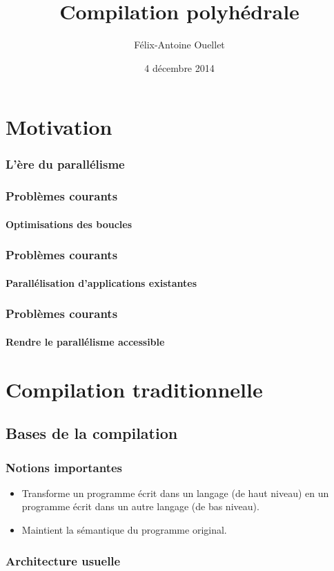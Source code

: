\documentclass{beamer}
\author[Félix-Antoine Ouellet]{Félix-Antoine Ouellet}
\title[PolyOpt\hspace{2em}\insertframenumber/\inserttotalframenumber]{Compilation polyhédrale}
\institute{Université de Sherbrooke}
\date{4 décembre 2014}
\begin{document}
\begin{frame}
\titlepage %
\end{frame}

\begin{frame}
\tableofcontents[hideallsubsections]
\end{frame}

\section{Motivation}
\begin{frame}
\frametitle{L'ère du parallélisme}

\end{frame}

\begin{frame}
\frametitle{Problèmes courants}
\framesubtitle{Optimisations des boucles}

\end{frame}

\begin{frame}
\frametitle{Problèmes courants}
\framesubtitle{Parallélisation d'applications existantes}

\end{frame}

\begin{frame}
\frametitle{Problèmes courants}
\framesubtitle{Rendre le parallélisme accessible}

\end{frame}

\section{Compilation traditionnelle}
\subsection{Bases de la compilation}
\begin{frame}
\frametitle{Notions importantes}
\begin{itemize}
\item Transforme un programme écrit dans un langage (de haut niveau) en un programme écrit dans un autre langage (de bas niveau).
\item Maintient la sémantique du programme original.
\end{itemize}
\end{frame}

\begin{frame}
\frametitle{Architecture usuelle}

\end{frame}
\end{document}
